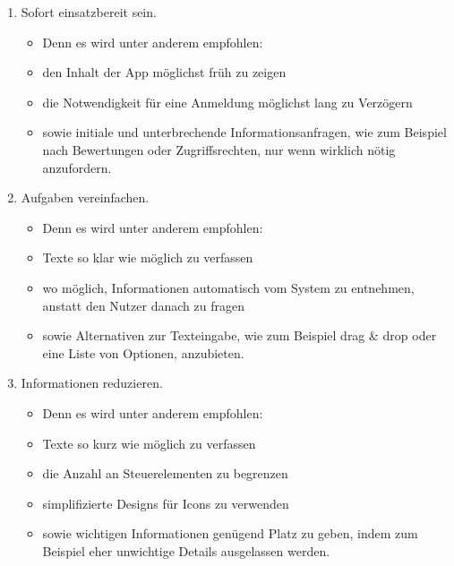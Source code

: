 \begin{enumerate}%
	\item Sofort einsatzbereit sein.%
	\begin{itemize}%
		\item[] Denn es wird unter anderem empfohlen:%
		\item den Inhalt der App möglichst früh zu zeigen\cite{konventionen_patterns_loading}%
		\item die Notwendigkeit für eine Anmeldung möglichst lang zu Verzögern\cite{konventionen_patterns_managingAccounts}%
		\item sowie initiale und unterbrechende Informationsanfragen, wie zum Beispiel nach Bewertungen oder Zugriffsrechten, nur wenn wirklich nötig anzufordern\cite{konventionen_patterns_launching}.%
	\end{itemize}


	\item Aufgaben vereinfachen.%
	\begin{itemize}%
		\item[] Denn es wird unter anderem empfohlen:%
		\item Texte so klar wie möglich zu verfassen\cite{konventionen_foundations_writing}
		\item wo möglich, Informationen automatisch vom System zu entnehmen, anstatt den Nutzer danach zu fragen\cite{konventionen_patterns_enteringData, konventionen_platforms_ios}
		\item sowie Alternativen zur Texteingabe, wie zum Beispiel \glqq drag \& drop\grqq{} oder eine Liste von Optionen, anzubieten\cite{konventionen_patterns_enteringData}.
	\end{itemize}

	\item Informationen reduzieren.%
	\begin{itemize}%
		\item[] Denn es wird unter anderem empfohlen:%
		\item Texte so kurz wie möglich zu verfassen\cite{konventionen_foundations_writing}
		\item die Anzahl an Steuerelementen zu begrenzen\cite{konventionen_platforms_ios}
		\item simplifizierte Designs für Icons zu verwenden\cite{konventionen_foundations_icons}
		\item sowie wichtigen Informationen genügend Platz zu geben, indem zum Beispiel eher unwichtige Details ausgelassen werden\cite{konventionen_foundations_layout}.
	\end{itemize}	


\end{enumerate}
